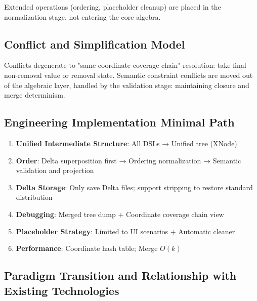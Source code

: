 \documentclass[11pt]{article}
\begin{document}
Extended operations (ordering, placeholder cleanup) are placed in the normalization stage, not entering the core algebra.

\subsection{Conflict and Simplification Model}

Conflicts degenerate to "same coordinate coverage chain" resolution: take final non-removal value or removal state. Semantic constraint conflicts are moved out of the algebraic layer, handled by the validation stage: maintaining closure and merge determinism.

\subsection{Engineering Implementation Minimal Path}

\begin{enumerate}
\item \textbf{Unified Intermediate Structure}: All DSLs → Unified tree (XNode)
\item \textbf{Order}: Delta superposition first → Ordering normalization → Semantic validation and projection
\item \textbf{Delta Storage}: Only save Delta files; support stripping to restore standard distribution
\item \textbf{Debugging}: Merged tree dump + Coordinate coverage chain view
\item \textbf{Placeholder Strategy}: Limited to UI scenarios + Automatic cleaner
\item \textbf{Performance}: Coordinate hash table; Merge $O(k)$
\end{enumerate}

\subsection{Paradigm Transition and Relationship with Existing Technologies}
\end{document}
